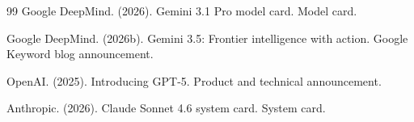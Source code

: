 \documentclass[11pt]{article}
\begin{document}
\begin{thebibliography}{99}
Google DeepMind. (2026).
\newblock Gemini 3.1 Pro model card.
\newblock Model card.

Google DeepMind. (2026b).
\newblock Gemini 3.5: Frontier intelligence with action.
\newblock Google Keyword blog announcement.

OpenAI. (2025).
\newblock Introducing GPT-5.
\newblock Product and technical announcement.

Anthropic. (2026).
\newblock Claude Sonnet 4.6 system card.
\newblock System card.

\end{thebibliography}
\end{document}
